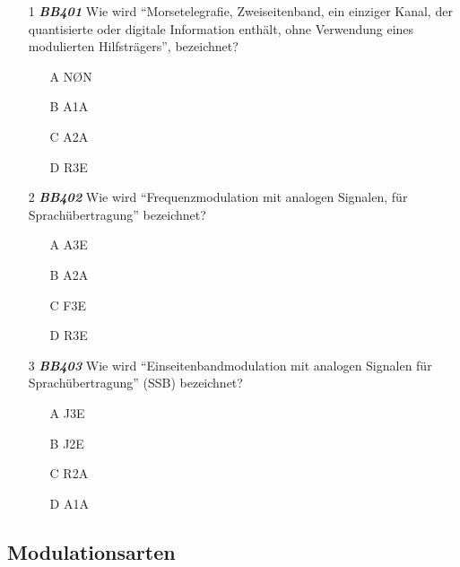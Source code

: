 \begin{enumerate} 
	\item[1] \emph{\textbf{BB401}}  Wie wird ``Morsetelegrafie, Zweiseitenband, ein einziger Kanal, der quantisierte oder digitale Information enthält, ohne Verwendung eines modulierten Hilfsträgers'', bezeichnet?
	\begin{enumerate}
	\itemsep1pt\parskip0pt
		\item[A] NØN
		\item[B] A1A
		\item[C] A2A
		\item[D] R3E
	\end{enumerate} 
	\item[2] \emph{\textbf{BB402}}  Wie wird ``Frequenzmodulation mit analogen Signalen, für Sprachübertragung'' bezeichnet?
	\begin{enumerate}
	\itemsep1pt\parskip0pt
		\item[A] A3E
		\item[B] A2A
		\item[C] F3E
		\item[D] R3E
	\end{enumerate} 
	\item[3] \emph{\textbf{BB403}}  Wie wird ``Einseitenbandmodulation mit analogen Signalen für Sprachübertragung'' (SSB) bezeichnet?
	\begin{enumerate}
	\itemsep1pt\parskip0pt
		\item[A] J3E
		\item[B] J2E
		\item[C] R2A
		\item[D] A1A
	\end{enumerate} 
\end{enumerate}

\subsection*{Modulationsarten}

